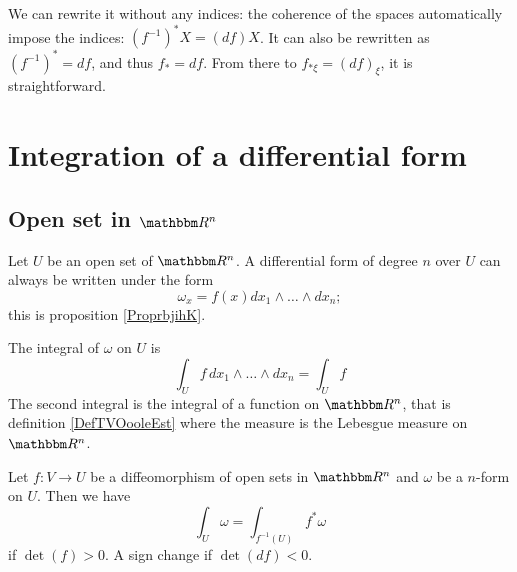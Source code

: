 We can rewrite it without  any indices: the coherence of the spaces automatically impose the indices: $(f^{-1})^*X=(df)X$. It can also be rewritten as $(f^{-1})^*=df$, and thus $f_*=df$. From there to $f_{* \xi}=(df)_{\xi}$, it is straightforward.

\section{Integration of a differential form}

\subsection{Open set in \( \eR^n\)}

Let \( U\) be an open set of \( \eR^n\). A differential form of degree \( n\) over \( U\) can always be written under the form
\begin{equation}
    \omega_x=f(x)dx_1\wedge\ldots\wedge dx_n;
\end{equation}
this is proposition \ref{ProprbjihK}. 

\begin{definition}      \label{DEFooEYRFooRQTmRF}
    The integral of \( \omega\) on \( U\) is
    \begin{equation}
        \int_{U}f\,dx_1\wedge\ldots\wedge dx_n=\int_Uf
    \end{equation}
    The second integral is the integral of a function on \( \eR^n\), that is definition \ref{DefTVOooleEst} where the measure is the Lebesgue measure on \( \eR^n\).
\end{definition}

\begin{lemma}       \label{LEMooNCYSooXtnCKq}
    Let \( f\colon V\to U\) be a diffeomorphism of open sets in \( \eR^n\) and \( \omega\) be a \( n\)-form on \( U\). Then we have
    \begin{equation}
        \int_U\omega=\int_{f^{-1}(U)}f^*\omega
    \end{equation}
    if \( \det(f)>0\). A sign change if \( \det(df)<0\).
\end{lemma}

